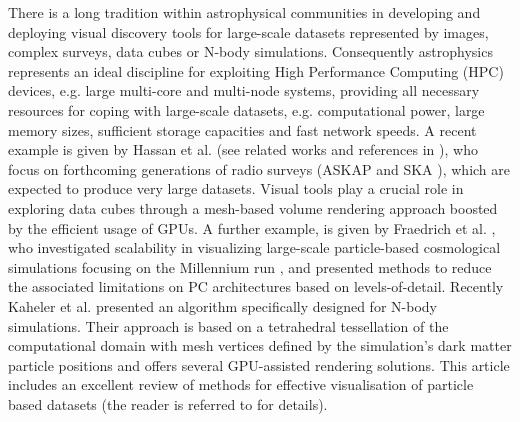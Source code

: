 \documentclass[1p]{elsarticle}
\begin{document}
There is a long tradition within astrophysical communities in developing and deploying visual discovery tools for large-scale datasets represented by images, complex surveys, data cubes or N-body simulations. Consequently astrophysics represents an ideal discipline for exploiting High Performance Computing (HPC) devices, e.g. large multi-core and multi-node systems, providing all necessary resources for coping with large-scale datasets, e.g. computational power, large memory sizes, sufficient storage capacities and fast network speeds. A recent example is given by Hassan et al. (see related works and references in \cite{2012ASPC..461...45H}), who focus on forthcoming generations of radio surveys (ASKAP and SKA \cite{}), which are expected to produce very large datasets. Visual tools play a crucial role in exploring data cubes through a mesh-based volume rendering approach boosted by the efficient usage of GPUs. A further example, is given by Fraedrich et al. \cite{Fraedrich:2009:TMV}, who
investigated scalability in visualizing large-scale particle-based cosmological 
simulations focusing on the Millennium run \cite{millennium}, and presented methods to reduce the associated limitations on PC architectures based on levels-of-detail.
Recently Kaheler et al. \cite{2012arXiv1208.3206K} presented an algorithm specifically designed for N-body simulations. Their approach is based on a tetrahedral tessellation of the computational domain with mesh vertices defined by the simulation's dark matter particle positions and offers several GPU-assisted rendering solutions. This article includes an excellent review of methods for effective visualisation of particle based datasets (the reader is referred to \cite{2012arXiv1208.3206K} for details).
\end{document}
